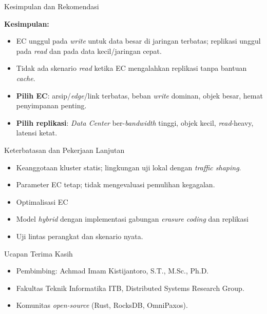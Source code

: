 \documentclass[a2,portrait]{config/poster/a0poster}
\newcommand{\postersection}[1]{%
	\begin{tcolorbox}[
		colback=MainBlue,
		colframe=MainBlue,
		fonttitle=\bfseries,
		coltext=white,
		sharp corners,
		boxrule=0pt,
		top=0pt,
		bottom=0pt,
		halign=center
	]
	\normalsize #1
	\end{tcolorbox}%
}
\begin{document}
\begin{multicols}{2}

\postersection{Kesimpulan dan Rekomendasi}
			\textbf{Kesimpulan:}
\begin{itemize}
	\item EC unggul pada \textit{write} untuk data besar di jaringan terbatas; replikasi unggul pada \textit{read} dan pada data kecil/jaringan cepat.
	\item Tidak ada skenario \textit{read} ketika EC mengalahkan replikasi tanpa bantuan \textit{cache}.
\end{itemize}
\begin{itemize}
	\item \textbf{Pilih EC}: arsip/\textit{edge}/link terbatas, beban \textit{write} dominan, objek besar, hemat penyimpanan penting.
	\item \textbf{Pilih replikasi}: \textit{Data Center} ber-\textit{bandwidth} tinggi, objek kecil, \textit{read}-heavy, latensi ketat.
\end{itemize}


\postersection{Keterbatasan dan Pekerjaan Lanjutan}
\begin{itemize}
	\item Keanggotaan kluster statis; lingkungan uji lokal dengan \textit{traffic shaping}.
	\item Parameter EC tetap; tidak mengevaluasi pemulihan kegagalan.
\end{itemize}
\begin{itemize}
	\item Optimalisasi EC
	\item Model \textit{hybrid} dengan implementasi gabungan \textit{erasure coding} dan replikasi
	\item Uji lintas perangkat dan skenario nyata.
\end{itemize}


\postersection{Ucapan Terima Kasih}
\begin{itemize}
	\item Pembimbing: Achmad Imam Kistijantoro, S.T., M.Sc., Ph.D.
	\item Fakultas Teknik Informatika ITB, Distributed Systems Research Group.
	\item Komunitas \textit{open-source} (Rust, RocksDB, OmniPaxos).
\end{itemize}


\end{multicols}
\end{document}
